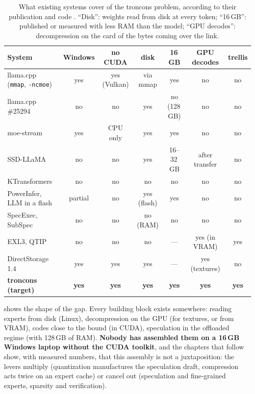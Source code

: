 \begin{table}[ht]
\centering\small
\caption[What existing systems cover of the troncons problem]{What existing systems cover of the troncons problem, according to their publication and code \litt. \enquote{Disk}: weights read from disk at every token; \enquote{16\,GB}: published or measured with less RAM than the model; \enquote{GPU decodes}: decompression on the card of the bytes coming over the link.}
\label{tab:positionnement}
\begin{tabular}{@{}lcccccc@{}}
\toprule
System & Windows & no CUDA & disk & 16\,GB & GPU decodes & trellis \\
\midrule
llama.cpp (\texttt{mmap}, \texttt{-ncmoe}) & yes & yes (Vulkan) & via mmap & yes & no & no \\
llama.cpp \#25294 & no & no & yes & no (128\,GB) & no & no \\
moe-stream & yes & CPU only & yes & yes & no & no \\
SSD-LLaMA & no & no & yes & 16--32\,GB & after transfer & no \\
KTransformers & no & no & no & no & no & no \\
PowerInfer, LLM in a flash & partial & no & yes (flash) & yes & no & no \\
SpecExec, SubSpec & no & no & no (RAM) & no & no & no \\
EXL3, QTIP & no & no & no & --- & yes (in VRAM) & yes \\
DirectStorage 1.4 & yes & yes & yes & --- & yes (textures) & no \\
\midrule
\textbf{troncons (target)} & \textbf{yes} & \textbf{yes} & \textbf{yes} & \textbf{yes} & \textbf{yes} & \textbf{yes} \\
\bottomrule
\end{tabular}
\end{table}

 shows the shape of the gap. Every building block exists somewhere: reading experts from disk (Linux), decompression on the GPU (for textures, or from VRAM), codes close to the bound (in CUDA), speculation in the offloaded regime (with 128\,GB of RAM). \textbf{Nobody has assembled them on a 16\,GB Windows laptop without the CUDA toolkit}, and the chapters that follow show, with measured numbers, that this assembly is not a juxtaposition: the levers multiply (quantization manufactures the speculation draft, compression acts twice on an expert cache) or cancel out (speculation and fine-grained experts, sparsity and verification).
